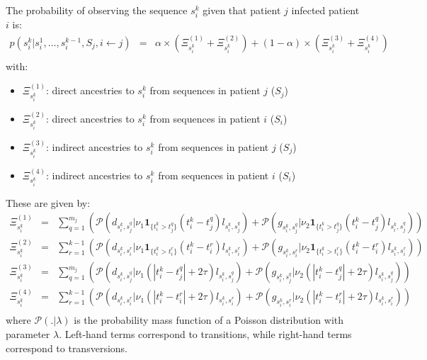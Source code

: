 \documentclass[10pt]{article}
\begin{document}
The probability of observing the sequence $s_i^k$ given that patient $j$ infected patient $i$ is:
\begin{eqnarray*}
p(s_i^k | s_i^1, \ldots, s_i^{k-1}, S_j, i \leftarrow j) & = & \alpha \times (\Xi_{s_i^k}^{(1)} + \Xi_{s_i^k}^{(2)}) + (1 - \alpha) \times (\Xi_{s_i^k}^{(3)} + \Xi_{s_i^k}^{(4)})\\
\end{eqnarray*}
with:
\begin{itemize}
 \item $\Xi_{s_i^k}^{(1)}$: direct ancestries to $s_i^k$ from sequences in patient $j$ ($S_j$)
 \item $\Xi_{s_i^k}^{(2)}$: direct ancestries to $s_i^k$ from sequences in patient $i$ ($S_i$)
 \item $\Xi_{s_i^k}^{(3)}$: indirect ancestries to $s_i^k$ from sequences in patient $j$ ($S_j$)
 \item $\Xi_{s_i^k}^{(4)}$: indirect ancestries to $s_i^k$ from sequences in patient $i$ ($S_i$)
\end{itemize}

These are given by:
\begin{eqnarray*}
\Xi_{s_i^k}^{(1)} & = & \sum_{q=1}^{m_j} \left(\mathcal{P}\left(d_{s_i^k,s_j^q} | \nu_1 \mathbf{1}_{\{t_i^k > t_j^q\}}(t_i^k - t_j^q) l_{s_i^k,s_j^q}\right)
+ \mathcal{P}\left(g_{s_i^k,s_j^q} | \nu_2 \mathbf{1}_{\{t_i^k > t_j^q\}}(t_i^k - t_j^q) l_{s_i^k,s_j^q}\right) \right) \\
\Xi_{s_i^k}^{(2)} & = & \sum_{r=1}^{k-1} \left(\mathcal{P}\left(d_{s_i^k,s_i^r} | \nu_1 \mathbf{1}_{\{t_i^k > t_i^r\}}(t_i^k - t_i^r) l_{s_i^k,s_i^r}\right)
+ \mathcal{P}\left(g_{s_i^k,s_i^r} | \nu_2 \mathbf{1}_{\{t_i^k > t_i^r\}}(t_i^k - t_i^r) l_{s_i^k,s_i^r}\right) \right) \\
\Xi_{s_i^k}^{(3)} & = & \sum_{q=1}^{m_j} \left(\mathcal{P}\left(d_{s_i^k,s_j^q} | \nu_1 (|t_i^k - t_j^q| + 2\tau) l_{s_i^k,s_j^q}\right)
+ \mathcal{P}\left(g_{s_i^k,s_j^q} | \nu_2 (|t_i^k - t_j^q| + 2\tau) l_{s_i^k,s_j^q}\right) \right) \\
\Xi_{s_i^k}^{(4)} & = & \sum_{r=1}^{k-1} \left(\mathcal{P}\left(d_{s_i^k,s_i^r} | \nu_1 (|t_i^k - t_i^r| + 2\tau) l_{s_i^k,s_i^r}\right)
+ \mathcal{P}\left(g_{s_i^k,s_i^r} | \nu_2 (|t_i^k - t_i^r| + 2\tau) l_{s_i^k,s_i^r}\right) \right)\\
\end{eqnarray*}
where $\mathcal{P}(.|\lambda)$ is the probability mass function of a Poisson distribution with parameter $\lambda$. Left-hand terms correspond to transitions, while right-hand terms correspond to transversions.
\\
\end{document}
